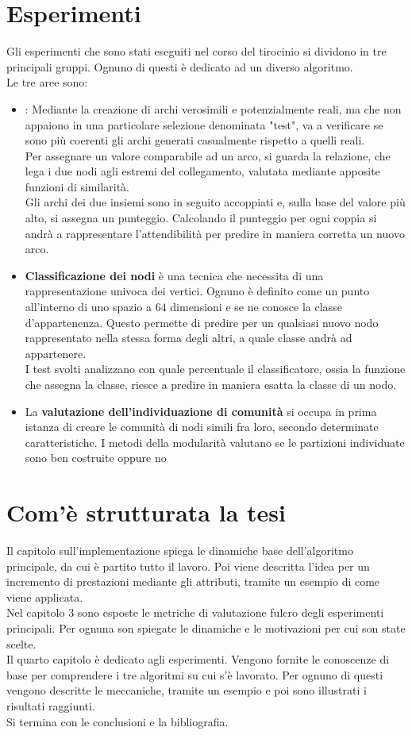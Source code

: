 \section{Esperimenti}
Gli esperimenti che sono stati eseguiti nel corso del tirocinio si dividono in tre principali gruppi. Ognuno di questi è dedicato ad un diverso algoritmo.\\
Le tre aree sono:
\begin{itemize}
	\item \textbf{\LPred}: Mediante la creazione di archi verosimili e potenzialmente reali, ma che non appaiono in una particolare selezione denominata "test", va a verificare se sono più coerenti gli archi generati casualmente rispetto a quelli reali.\\
	Per assegnare un valore comparabile ad un arco, si guarda la relazione, che lega i due nodi agli estremi del collegamento, valutata mediante apposite funzioni di similarità.\\
	Gli archi dei due insiemi sono in seguito accoppiati e, sulla base del valore più alto, si assegna un punteggio. Calcolando il punteggio per ogni coppia si andrà a rappresentare l'attendibilità per predire in maniera corretta un nuovo arco.
	\item \textbf{Classificazione dei nodi} è una tecnica che necessita di una rappresentazione univoca dei vertici. Ognuno è definito come un punto all'interno di uno spazio a $64$ dimensioni e se ne conosce la classe d'appartenenza. Questo permette di predire per un qualsiasi nuovo nodo rappresentato nella stessa forma degli altri, a quale classe andrà ad appartenere.\\
	I test svolti analizzano con quale percentuale il classificatore, ossia la funzione che assegna la classe, riesce a predire in maniera esatta la classe di un nodo.
	\item La \textbf{valutazione dell'individuazione di comunità} si occupa in prima istanza di creare le comunità di nodi simili fra loro, secondo determinate caratteristiche. I metodi della modularità valutano se le partizioni individuate sono ben costruite oppure no
\end{itemize}
%
\section{Com'è strutturata la tesi}
Il capitolo sull'implementazione spiega le dinamiche base dell'algoritmo principale, da cui è partito tutto il lavoro. Poi viene descritta l'idea per un incremento di prestazioni mediante gli attributi, tramite un esempio di come viene applicata.\\
Nel capitolo 3 sono esposte le metriche di valutazione fulcro degli esperimenti principali. Per ognuna son spiegate le dinamiche e le motivazioni per cui son state scelte.\\
Il quarto capitolo è dedicato agli esperimenti. Vengono fornite le conoscenze di base per comprendere i tre algoritmi su cui s'è lavorato. Per ognuno di questi vengono descritte le meccaniche, tramite un esempio e poi sono illustrati i risultati raggiunti.\\
Si termina con le conclusioni e la bibliografia.
%

\newpage
%



